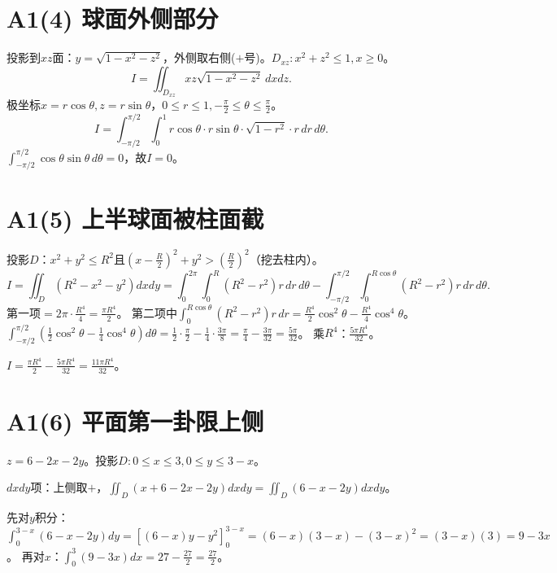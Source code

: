 \documentclass[12pt,a4paper]{ctexart}
\newcommand{\answerbox}[1]{\begin{center}\fbox{\color{red}\large\bfseries #1}\end{center}}
\begin{document}
\section{A1(4) 球面外侧部分}


投影到$xz$面：$y=\sqrt{1-x^2-z^2}$，外侧取右侧($+$号)。$D_{xz}:x^2+z^2\le1,x\ge0$。
\[I=\iint_{D_{xz}}xz\sqrt{1-x^2-z^2}\,dxdz.\]
极坐标$x=r\cos\theta,z=r\sin\theta$，$0\le r\le1,-\frac\pi2\le\theta\le\frac\pi2$。
\[I=\int_{-\pi/2}^{\pi/2}\!\!\int_0^1 r\cos\theta\cdot r\sin\theta\cdot\sqrt{1-r^2}\cdot r\,dr\,d\theta.\]
$\int_{-\pi/2}^{\pi/2}\cos\theta\sin\theta\,d\theta=0$，故$I=0$。
\answerbox{$0$}

\section{A1(5) 上半球面被柱面截}


投影$D$：$x^2+y^2\le R^2$且$(x-\frac R2)^2+y^2>(\frac R2)^2$（挖去柱内）。
\[I=\iint_D(R^2-x^2-y^2)dxdy
   =\int_0^{2\pi}\!\!\int_0^R(R^2-r^2)r\,dr\,d\theta
    -\int_{-\pi/2}^{\pi/2}\!\!\int_0^{R\cos\theta}(R^2-r^2)r\,dr\,d\theta.\]
第一项$=2\pi\cdot\frac{R^4}{4}=\frac{\pi R^4}{2}$。
第二项中$\int_0^{R\cos\theta}(R^2-r^2)r\,dr=\frac{R^4}{2}\cos^2\theta-\frac{R^4}{4}\cos^4\theta$。
$\int_{-\pi/2}^{\pi/2}(\frac12\cos^2\theta-\frac14\cos^4\theta)d\theta
   =\frac12\cdot\frac\pi2-\frac14\cdot\frac{3\pi}{8}=\frac\pi4-\frac{3\pi}{32}=\frac{5\pi}{32}$。
乘$R^4$：$\frac{5\pi R^4}{32}$。

$I=\frac{\pi R^4}{2}-\frac{5\pi R^4}{32}=\frac{11\pi R^4}{32}$。
\answerbox{$\frac{11\pi R^4}{32}$}

\section{A1(6) 平面第一卦限上侧}


$z=6-2x-2y$。投影$D:0\le x\le3,0\le y\le3-x$。

$dxdy$项：上侧取$+$，$\iint_D(x+6-2x-2y)dxdy=\iint_D(6-x-2y)dxdy$。

先对$y$积分：$\int_0^{3-x}(6-x-2y)dy=[(6-x)y-y^2]_0^{3-x}=(6-x)(3-x)-(3-x)^2=(3-x)(3)=9-3x$。
再对$x$：$\int_0^3(9-3x)dx=27-\frac{27}{2}=\frac{27}{2}$。
\end{document}
